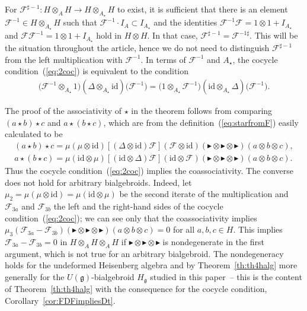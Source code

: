 \documentclass[pdftex]{sigma}
\def\gg{\mathfrak{g}}
\def\id{\mathrm{id}}
\numberwithin{equation}{section}
\begin{document}
\begin{Remark} \label{rem:invcoc}
For $\mathcal{F}^{\sharp -1}\colon H\otimes_{A} H\to H\otimes_{A_\star}H$ to exist, it is sufficient that there is an element $\mathcal{F}^{-1}\in H\otimes_{A_\star} H$ such that $\mathcal{F}^{-1}\cdot I_A \subset I_{A_\star}$ and the identities $\mathcal{F}^{-1}\mathcal{F} = 1\otimes 1 + I_{A_\star}$ and $\mathcal{F}\mathcal{F}^{-1} = 1\otimes 1 + I_{A_\star}$ hold in $H\otimes H$. In that case, $\mathcal{F}^{\sharp -1} = \mathcal{F}^{-1 \sharp}$. This will be the situation throughout the article, hence
we do not need to distinguish $\mathcal{F}^{\sharp -1}$ from the left multiplication with $\mathcal{F}^{-1}$.
In terms of $\mathcal{F}^{-1}$ and $A_\star$,
the cocycle condition~(\ref{eq:2coc}) is equivalent to the condition
\begin{gather*}
\big(\mathcal{F}^{-1}\otimes_{A_\star} 1\big)(\Delta\otimes_{A_\star}\mathrm{id})\big(\mathcal{F}^{-1}\big)
= \big(1\otimes_{A_\star}\mathcal{F}^{-1}\big)(\mathrm{id}\otimes_{A_\star}\Delta)\big(\mathcal{F}^{-1}\big).
\end{gather*}
\end{Remark}

\begin{Remark}\label{rem:cocyccoass} The proof of the associativity of $\star$ in the theorem follows from comparing $(a\star b)\star c$ and $a\star(b\star c)$, which are from the definition~(\ref{eq:starfromF}) easily calculated to be
\begin{gather*}
(a\star b) \star c = \mu(\mu\otimes\id)[(\Delta\otimes\id)\mathcal{F}](\mathcal{F}\otimes\id)(\blacktriangleright\otimes\blacktriangleright\otimes\blacktriangleright)(a\otimes b\otimes c),
\\
a\star (b \star c) = \mu(\id\otimes\mu)[(\id\otimes\Delta)\mathcal{F}](\id\otimes \mathcal{F})(\blacktriangleright\otimes\blacktriangleright\otimes\blacktriangleright)(a\otimes b\otimes c).
\end{gather*}
Thus the cocycle condition~(\ref{eq:2coc}) implies the coassociativity. The converse does not hold for arbitrary bialgebroids. Indeed, let $\mu_2 = \mu(\mu\otimes\id) = \mu(\id\otimes\mu)$ be the second iterate of the multiplication and $\mathcal{F}_{3a}$ and $\mathcal{F}_{3b}$ the left and the right-hand sides of the cocycle condition~(\ref{eq:2coc}); we can see only that the coassociativity implies $\mu_3(\mathcal{F}_{3a}-\mathcal{F}_{3b})(\blacktriangleright\otimes \blacktriangleright\otimes\blacktriangleright)(a\otimes b\otimes c) = 0$
for all $a,b,c\in H$. This implies $\mathcal{F}_{3a}-\mathcal{F}_{3b} = 0$ in $H\otimes_A H\otimes_A H$ if $\blacktriangleright\otimes\blacktriangleright \otimes\blacktriangleright$ is nondegenerate in the first argument, which is not true for
an arbitrary bialgebroid. The nondegeneracy holds for the undeformed Heisenberg algebra and by Theorem~\ref{th:th4halg} more generally for the $U(\gg)$-bialgebroid $H_\gg$ studied in this paper~-- this is the content of Theorem~\ref{th:th4halg} with the consequence for the cocycle condition, Corollary~\ref{cor:FDFimpliesDt}.
\end{Remark}
\end{document}
